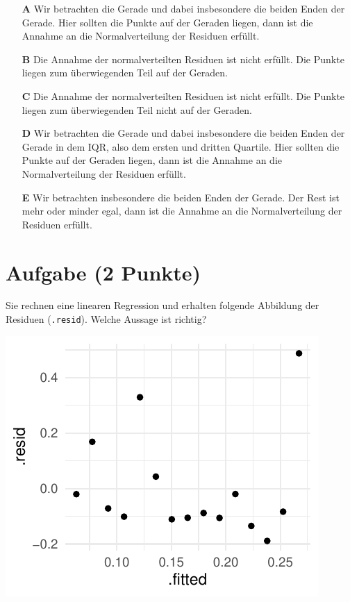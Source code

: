\documentclass[a4paper, 9pt]{scrartcl}\usepackage[]{graphicx}\usepackage[]{xcolor}
\makeatletter
\def\maxwidth{ %
  \ifdim\Gin@nat@width>\linewidth
    \linewidth
  \else
    \Gin@nat@width
  \fi
}
\makeatother
\begin{document}
\begin{enumerate}
\item [\textbf{A} \msquare] Wir betrachten die Gerade und dabei insbesondere die beiden Enden der Gerade. Hier sollten die Punkte auf der Geraden liegen, dann ist die Annahme an die Normalverteilung der Residuen erfüllt.
\item [\textbf{B} \msquare] Die Annahme der normalverteilten Residuen ist nicht erfüllt. Die Punkte liegen zum überwiegenden Teil auf der Geraden.
\item [\textbf{C} \msquare] Die Annahme der normalverteilten Residuen ist nicht erfüllt. Die Punkte liegen zum überwiegenden Teil nicht auf der Geraden.
\item [\textbf{D} \msquare] Wir betrachten die Gerade und dabei insbesondere die beiden Enden der Gerade in dem IQR, also dem ersten und dritten Quartile. Hier sollten die Punkte auf der Geraden liegen, dann ist die Annahme an die Normalverteilung der Residuen erfüllt.
\item [\textbf{E} \msquare] Wir betrachten insbesondere die beiden Enden der Gerade. Der Rest ist mehr oder minder egal, dann ist die Annahme an die Normalverteilung der Residuen erfüllt.
\end{enumerate}

\section{Aufgabe \hfill (2 Punkte)}



Sie rechnen eine linearen Regression und erhalten folgende Abbildung der Residuen (\texttt{.resid}). Welche Aussage ist richtig?



{\centering \includegraphics[width=\maxwidth]{img/mc-regression-06-a-1} 

}
\end{document}
